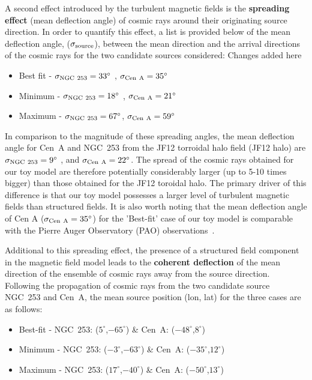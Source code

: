 \documentclass[usenatbib]{mnras}
\newcommand{\Vasu}[1]{{\color{purple}#1}}
\begin{document}
A second effect introduced by the turbulent magnetic fields is the {\bf spreading effect} (mean deflection angle) of cosmic rays around their originating source direction. In order to quantify this effect, a list is provided below of the mean deflection angle, ($\sigma_{\rm source}$), between the mean direction and the arrival directions of the cosmic rays for the two candidate sources considered:
\newline
\Vasu{Changes added here}
\begin{itemize}
        \item Best fit - $\sigma_{\rm NGC~253} = 33^{\circ}$ , {$\sigma_{\rm Cen~A} = 35^{\circ}$}
        \item Minimum - $\sigma_{\rm NGC~253} = 18^{\circ}$ , $\sigma_{\rm Cen~A} = 21^{\circ}$
        \item Maximum - $\sigma_{\rm NGC~253} = 67^{\circ}$, $\sigma_{\rm Cen~A} = 59^{\circ}$
\end{itemize}

In comparison to the magnitude of these spreading angles, the mean deflection angle for Cen~A and NGC~253 from the JF12 torroidal halo field (JF12 halo) \citep{JF12}  are  $\sigma_{\rm NGC~253} = 9^{\circ}$ , and {$\sigma_{\rm Cen~A} = 22^{\circ}$}.  The spread of the cosmic rays obtained for our toy model are therefore potentially considerably larger (up to 5-10 times bigger) than those obtained for the JF12 toroidal halo. The primary driver of this difference is that our toy model possesses a larger level of turbulent magnetic fields than structured fields. It is also worth noting that the mean deflection angle of Cen A ($\sigma_{\rm Cen~A} = 35^{\circ}$) for the 'Best-fit' case of our toy model is comparable with the Pierre Auger Observatory (PAO) observations~\citep{Auger_ICRC_2021}. 

Additional to this spreading effect, the presence of a structured field component in the magnetic field model leads to the {\bf coherent deflection} of the mean direction of the ensemble of cosmic rays away from the source direction. Following the propagation of cosmic rays from the two candidate source NGC~253 and Cen~A, the mean source position (lon, lat) for the three cases are as follows:
\begin{itemize}
    \item Best-fit - NGC~253: ($5^{\circ}$,$-65^{\circ}$) \& Cen~A: ($-48^{\circ}$,$8^{\circ}$) 
    \item Minimum - NGC~253: ($-3^{\circ}$,$-63^{\circ}$) \& Cen~A: ($-35^{\circ}$,$12^{\circ}$) 
    \item Maximum - NGC~253: ($17^{\circ}$,$-40^{\circ}$) \& Cen~A: ($-50^{\circ}$,$13^{\circ}$) 
\end{itemize}
\end{document}
